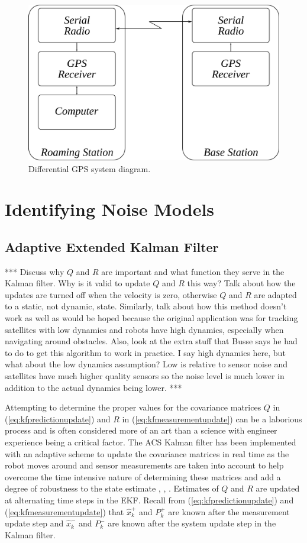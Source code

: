 \begin{figure}[ht!]
	\centering
	\includegraphics[width=.6\textwidth]{images/dgps}
	\caption{Differential GPS system diagram.}
	\label{fig:dgps}
\end{figure}

\section{Identifying Noise Models}

\subsection{Adaptive Extended Kalman Filter}
\label{sec:adaptiveekf}
*** Discuss why $Q$ and $R$ are important and what function they serve in the Kalman filter. Why is it valid to update $Q$ and $R$ this way? Talk about how the updates are turned off when the velocity is zero, otherwise $Q$ and $R$ are adapted to a static, not dynamic, state. Similarly, talk about how this method doesn't work as well as would be hoped because the original application was for tracking satellites with low dynamics and robots have high dynamics, especially when navigating around obstacles. Also, look at the extra stuff that Busse says he had to do to get this algorithm to work in practice. I say high dynamics here, but what about the low dynamics assumption? Low is relative to sensor noise and satellites have much higher quality sensors so the noise level is much lower in addition to the actual dynamics being lower. ***

Attempting to determine the proper values for the covariance matrices $Q$ in (\ref{eq:kfpredictionupdate}) and $R$ in (\ref{eq:kfmeasurementupdate}) can be a laborious process and is often considered more of an art than a science with engineer experience being a critical factor. The ACS Kalman filter has been implemented with an adaptive scheme to update the covariance matrices in real time as the robot moves around and sensor measurements are taken into account to help overcome the time intensive nature of determining these matrices and add a degree of robustness to the state estimate \cite{Sights06}, \cite{Mehra72}, \cite{Busse03adaptiveEKF}. Estimates of $Q$ and $R$ are updated at alternating time steps in the EKF. Recall from (\ref{eq:kfpredictionupdate}) and (\ref{eq:kfmeasurementupdate}) that $\hat{x}_k^+$ and $P_k^+$ are known after the measurement update step and $\hat{x}_k^-$ and $P_k^-$ are known after the system update step in the Kalman filter.

